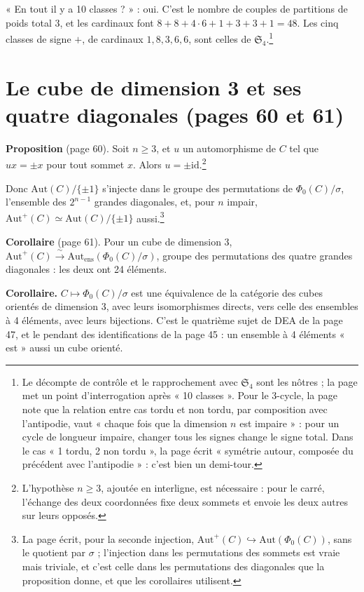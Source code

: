 \documentclass[11pt,a4paper]{article}
\begin{document}
« En tout il y a 10 classes ? » : oui. C'est le nombre de couples de
partitions de poids total 3, et les cardinaux font $8 + 8 + 4 \cdot 6 + 1 + 3
+ 3 + 1 = 48$. Les cinq classes de signe $+$, de cardinaux $1, 8, 3, 6, 6$,
sont celles de $\mathfrak{S}_4$.\footnote{Le décompte de contrôle et le
rapprochement avec $\mathfrak{S}_4$ sont les nôtres ; la page met un point
d'interrogation après « 10 classes ». Pour le 3-cycle, la page note que la
relation entre cas tordu et non tordu, par composition avec l'antipodie, vaut
« chaque fois que la dimension $n$ est impaire » : pour un cycle de longueur
impaire, changer tous les signes change le signe total. Dans le cas
« 1 tordu, 2 non tordu », la page écrit « symétrie autour, composée du
précédent avec l'antipodie » : c'est bien un demi-tour.}

\section*{Le cube de dimension 3 et ses quatre diagonales (pages 60 et 61)}

\textbf{Proposition} (page 60). Soit $n \geqslant 3$, et $u$ un automorphisme
de $C$ tel que $u x = \pm x$ pour tout sommet $x$. Alors $u = \pm
\mathrm{id}$.\footnote{L'hypothèse $n \geqslant 3$, ajoutée en interligne, est
nécessaire : pour le carré, l'échange des deux coordonnées fixe deux sommets
et envoie les deux autres sur leurs opposés.}

Donc $\mathrm{Aut}(C)/\{\pm 1\}$ s'injecte dans le groupe des permutations de
$\Phi_0(C)/\sigma$, l'ensemble des $2^{n-1}$ grandes diagonales, et, pour $n$
impair, $\mathrm{Aut}^+(C) \simeq \mathrm{Aut}(C)/\{\pm 1\}$ aussi.\footnote{La
page écrit, pour la seconde injection, $\mathrm{Aut}^+(C) \hookrightarrow
\mathrm{Aut}(\Phi_0(C))$, sans le quotient par $\sigma$ ; l'injection dans
les permutations des sommets est vraie mais triviale, et c'est celle dans les
permutations des diagonales que la proposition donne, et que les corollaires
utilisent.}

\textbf{Corollaire} (page 61). Pour un cube de dimension 3,
$\mathrm{Aut}^+(C) \xrightarrow{\ \sim\ } \mathrm{Aut}_{\mathrm{ens}}
(\Phi_0(C)/\sigma)$, groupe des permutations des quatre grandes diagonales :
les deux ont 24 éléments.

\textbf{Corollaire.} $C \mapsto \Phi_0(C)/\sigma$ est une équivalence de la
catégorie des cubes orientés de dimension 3, avec leurs isomorphismes
directs, vers celle des ensembles à 4 éléments, avec leurs bijections. C'est
le quatrième sujet de DEA de la page 47, et le pendant des identifications de
la page 45 : un ensemble à 4 éléments « est » aussi un cube orienté.
\end{document}
